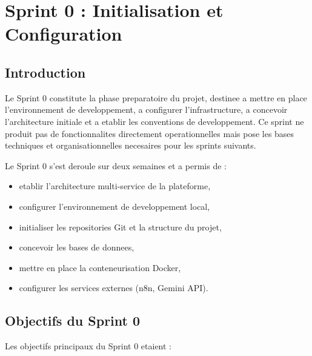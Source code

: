 \chapter{Sprint 0 : Initialisation et Configuration}
\label{chap:sprint-0}

\section{Introduction}

Le Sprint 0 constitute la phase preparatoire du projet, destinee a mettre en place l'environnement de developpement, a configurer l'infrastructure, a concevoir l'architecture initiale et a etablir les conventions de developpement. Ce sprint ne produit pas de fonctionnalites directement operationnelles mais pose les bases techniques et organisationnelles necesaires pour les sprints suivants.

Le Sprint 0 s'est deroule sur deux semaines et a permis de :
\begin{itemize}
    \item etablir l'architecture multi-service de la plateforme,
    \item configurer l'environnement de developpement local,
    \item initialiser les repositories Git et la structure du projet,
    \item concevoir les bases de donnees,
    \item mettre en place la conteneurisation Docker,
    \item configurer les services externes (n8n, Gemini API).
\end{itemize}

\section{Objectifs du Sprint 0}

Les objectifs principaux du Sprint 0 etaient :

